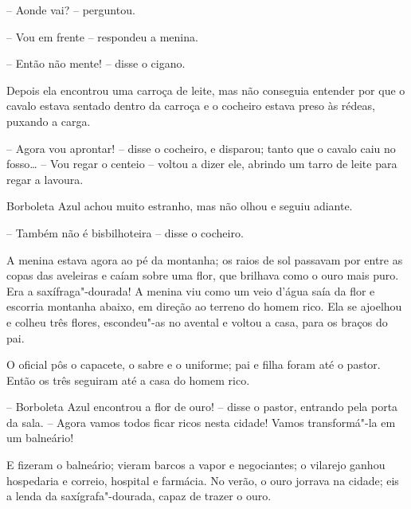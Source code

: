 -- Aonde vai? -- perguntou.

-- Vou em frente -- respondeu a menina.

-- Então não mente! -- disse o cigano.

Depois ela encontrou uma carroça de leite, mas não conseguia entender
por que o cavalo estava sentado dentro da carroça e o cocheiro estava
preso às rédeas, puxando a carga.

-- Agora vou aprontar! -- disse o cocheiro, e disparou; tanto que o cavalo
caiu no fosso\ldots{} -- Vou regar o centeio -- voltou a dizer ele, abrindo um
tarro de leite para regar a lavoura.

Borboleta Azul achou muito estranho, mas não olhou e seguiu adiante.

-- Também não é bisbilhoteira -- disse o cocheiro.

A menina estava agora ao pé da montanha; os raios de sol passavam por
entre as copas das aveleiras e caíam sobre uma flor, que brilhava como
o ouro mais puro. Era a saxífraga"-dourada! A menina viu como um veio
d’água saía da flor e escorria montanha abaixo, em direção ao terreno
do homem rico. Ela se ajoelhou e colheu três flores, escondeu"-as no
avental e voltou a casa, para os braços do pai.

O oficial pôs o capacete, o sabre e o uniforme; pai e filha foram até o
pastor. Então os três seguiram até a casa do homem rico.

-- Borboleta Azul encontrou a flor de ouro! -- disse o pastor, entrando
pela porta da sala. -- Agora vamos todos ficar ricos nesta cidade! Vamos
transformá"-la em um balneário!

E fizeram o balneário; vieram barcos a vapor e negociantes; o vilarejo
ganhou hospedaria e correio, hospital e farmácia. No verão, o ouro
jorrava na cidade; eis a lenda da saxígrafa"-dourada, capaz de trazer o ouro.
